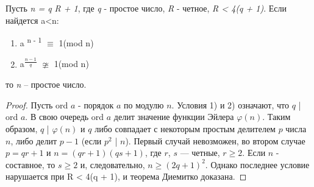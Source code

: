   \begin{theorem}[Диемитко]
      Пусть \textit{n = q R + 1}, где \textit{q} - простое число, \textit{R} - четное, \textit{R < 4(q + 1)}. Если найдется a<n:
      
	\begin{enumerate}
	 \item a\textsuperscript{ n - 1} {$\equiv$} 1(mod n)
	 \item a\textsuperscript{ {$\frac{n - 1}{q}$}} {$\ncong$} 1(mod n)
	\end{enumerate}
	
      то \textit{n} – простое число.
  \end{theorem}
  
  \begin{proof}
    Пусть ord $a$ - порядок $a$ по модулю $n$. Условия 1) и 2) означают, что $q$ | ord $a$. В свою очередь ord $a$ делит значение функции
    Эйлера $\varphi(n)$. Таким образом, $q$ | $\varphi(n)$ и $q$ либо совпадает с некоторым простым делителем $p$ числа $n$, либо делит $p - 1$ 
    (если $p^2$ | $n$). Первый случай невозможен, во втором случае $p = qr + 1$ и $n = (qr + 1)(qs + 1)$, где $r$, $s$ — четные, $r \ge 2$.
    Если $n$ - составное, то $s \ge 2$ и, следовательно, $n \ge (2q + 1)^2$. Однако последнее условие нарушается при R < 4(q + 1), и теорема 
    Диемитко доказана.
  \end{proof}


